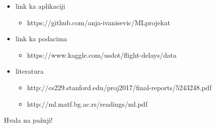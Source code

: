 \documentclass{beamer}
\begin{document}
\begin{frame} 
	\begin{itemize}
		\item link ka aplikaciji
			\begin{itemize}
			\item https://github.com/anja-ivanisevic/ML\textunderscore projekat
			\end{itemize}
		\item link ka podacima
			\begin{itemize}
				\item https://www.kaggle.com/usdot/flight-delays/data
			\end{itemize}
		\item literatura
			\begin{itemize}
				\item http://cs229.stanford.edu/proj2017/final-reports/5243248.pdf
    			\item http://ml.matf.bg.ac.rs/readings/ml.pdf
			\end{itemize}
	\end{itemize}
\end{frame}


\begin{frame}{}
    \centering
    Hvala na pažnji!
\end{frame}
\end{document}
